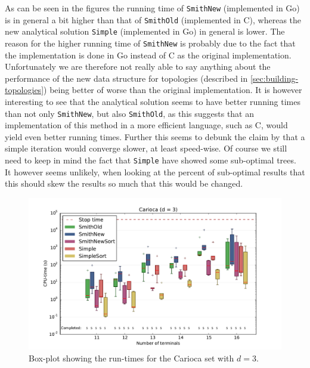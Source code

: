 As can be seen in the figures the running time of \texttt{SmithNew} (implemented
in Go) is in general a bit higher than that of \texttt{SmithOld} (implemented in
C), whereas the new analytical solution \texttt{Simple} (implemented in Go) in
general is lower. The reason for the higher running time of \texttt{SmithNew} is
probably due to the fact that the implementation is done in Go instead of C as
the original implementation. Unfortunately we are therefore not really able to
say anything about the performance of the new data structure for topologies
(described in \cref{sec:building-topologies}) being better of worse than the
original implementation. It is however interesting to see that the analytical
solution seems to have better running times than not only \texttt{SmithNew}, but
also \texttt{SmithOld}, as this suggests that an implementation of this method
in a more efficient language, such as C, would yield even better running times.
Further this seems to debunk the claim by \textcite{smith1992} that a simple
iteration would converge slower, at least speed-wise. Of course we still need to
keep in mind the fact that \texttt{Simple} have showed some sub-optimal trees.
It however seems unlikely, when looking at the percent of sub-optimal results
that this should skew the results so much that this would be changed.

\begin{figure}[htbp]
  \centering
  \includegraphics[width=\textwidth]{gfx/boxplots/plot_nvst_boxplot_d3_Carioca_1}
  \caption[Box-plot for Carioca with $d = 3$]{Box-plot showing the run-times for
    the Carioca set with $d = 3$.\label{fig:boxplot-carioca-d3}}
\end{figure}

